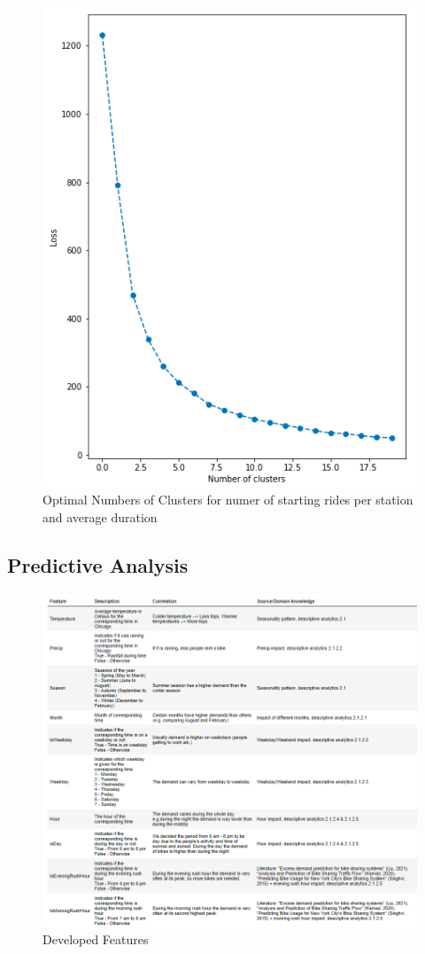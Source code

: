 \begin{figure}[H]
   \centering
    \includegraphics[width=0.7\linewidth]{./Figures/BC_ABB11.png}
    \caption{Optimal Numbers of Clusters for numer of starting rides per station and average duration}
    \label{BCABB11}
\end{figure}

\subsection{Predictive Analysis}
\label{app:A8}

\begin{figure}[H]
   \centering
    \includegraphics[width=1\linewidth]{./Figures/RF_Fig_1.png}
    \caption{Developed Features}
    \label{Pred_Fig_1}
\end{figure}

